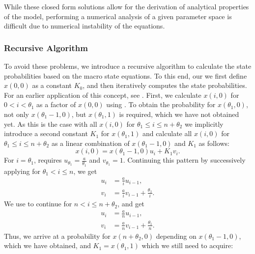 While these closed form solutions allow for the derivation of analytical properties of the model, performing a numerical analysis of a given parameter space is difficult due to numerical instability of the equations.

\subsubsection*{Recursive Algorithm}
To avoid these problems, we introduce a recursive algorithm to calculate the state probabilities based on the macro state equations.
To this end, our we first define \(x(0,0)\) as a constant \(K_0\), and then iteratively computes the state probabilities.
For an earlier application of this concept, see \cite{Trangia1997}.
First, we calculate \(x(i,0)\) for \(0<i<\theta_1\) as a factor of \(x(0,0)\) using .
To obtain the probability for \(x(\theta_1,0)\), not only \(x(\theta_1 -1, 0)\), but \(x(\theta_1, 1)\) is required, which we have not obtained yet.
As this is the case with all \(x(i,0)\) for \(\theta_1 \leq i \leq n + \theta_2\) we implicitly introduce a second constant \(K_1\) for \(x(\theta_1, 1)\) and calculate all \(x(i,0)\) for \(\theta_1 \leq i \leq n + \theta_2\) as a linear combination of \(x(\theta_1 - 1,0)\) and \(K_1\) as follows:
\begin{equation}
x(i, 0) = x(\theta_1 - 1, 0) u_i + K_1 v_i.\label{eq:cloud:data_centers:modeling:closed_form_solution:linear_combination}
\end{equation}
For \(i = \theta_1\),  requires \(u_{\theta_1} = \frac{a}{\theta_1}\) and \(v_{\theta_1} = 1\).
Continuing this pattern by successively applying  for \(\theta_1 < i \leq n\), we get
\begin{align*}
u_i &= \frac{a}{i}u_{i-1},\\
v_i &= \frac{a}{i}v_{i-1} + \frac{\theta_1}{i}.
\end{align*}
We use  to continue for \(n < i \leq n + \theta_2\), and get
\begin{align*}
u_i &= \frac{a}{n}u_{i-1},\\
v_i &= \frac{a}{n}v_{i-1} + \frac{\theta_1}{n}.
\end{align*}
Thus, we arrive at a probability for \(x(n + \theta_2,0)\) depending on \(x(\theta_1 -1,0)\), which we have obtained, and \(K_1 = x(\theta_1,1)\) which we still need to acquire:
